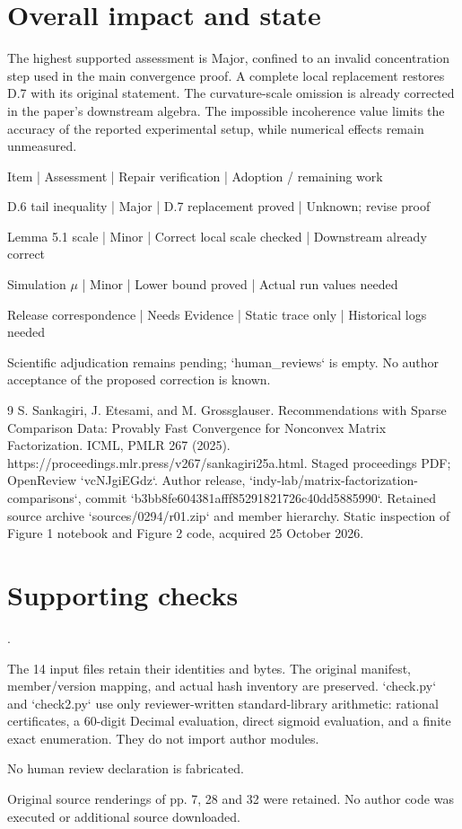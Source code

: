 \documentclass[10pt]{article}
\begin{document}
\section*{Overall impact and state}
The highest supported assessment is Major, confined to an invalid concentration step used in the main convergence proof. A complete local replacement restores D.7 with its original statement. The curvature-scale omission is already corrected in the paper’s downstream algebra. The impossible incoherence value limits the accuracy of the reported experimental setup, while numerical effects remain unmeasured.\par
Item | Assessment | Repair verification | Adoption / remaining work\par
D.6 tail inequality | Major | D.7 replacement proved | Unknown; revise proof\par
Lemma 5.1 scale | Minor | Correct local scale checked | Downstream already correct\par
Simulation \(\mu\) | Minor | Lower bound proved | Actual run values needed\par
Release correspondence | Needs Evidence | Static trace only | Historical logs needed\par
Scientific adjudication remains pending; `human\_reviews` is empty. No author acceptance of the proposed correction is known.\par
9 S. Sankagiri, J. Etesami, and M. Grossglauser. Recommendations with Sparse Comparison Data: Provably Fast Convergence for Nonconvex Matrix Factorization. ICML, PMLR 267 (2025). https://proceedings.mlr.press/v267/sankagiri25a.html. Staged proceedings PDF; OpenReview `vcNJgiEGdz`. Author release, `indy-lab/matrix-factorization-comparisons`, commit `b3bb8fe604381afff85291821726c40dd5885990`. Retained source archive `sources/0294/r01.zip` and member hierarchy. Static inspection of Figure 1 notebook and Figure 2 code, acquired 25 October 2026.\par
\section*{Supporting checks}
.\par
The 14 input files retain their identities and bytes. The original manifest, member/version mapping, and actual hash inventory are preserved. `check.py` and `check2.py` use only reviewer-written standard-library arithmetic: rational certificates, a 60-digit Decimal evaluation, direct sigmoid evaluation, and a finite exact enumeration. They do not import author modules.\par
No human review declaration is fabricated.\par
Original source renderings of pp. 7, 28 and 32 were retained. No author code was executed or additional source downloaded.\par
\end{document}

